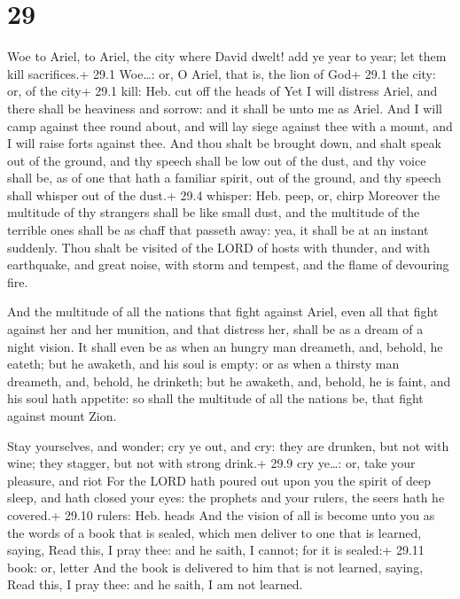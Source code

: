 \hypertarget{section-28}{%
\section{29}\label{section-28}}

 Woe to Ariel, to Ariel, the city where David dwelt! add ye
year to year; let them kill sacrifices.+ 29.1 Woe\ldots: or, O Ariel,
that is, the lion of God+ 29.1 the city: or, of the city+ 29.1 kill:
Heb. cut off the heads of  Yet I will distress Ariel, and
there shall be heaviness and sorrow: and it shall be unto me as Ariel.
 And I will camp against thee round about, and will lay
siege against thee with a mount, and I will raise forts against thee.
 And thou shalt be brought down, and shalt speak out of the
ground, and thy speech shall be low out of the dust, and thy voice shall
be, as of one that hath a familiar spirit, out of the ground, and thy
speech shall whisper out of the dust.+ 29.4 whisper: Heb. peep, or,
chirp  Moreover the multitude of thy strangers shall be like
small dust, and the multitude of the terrible ones shall be as chaff
that passeth away: yea, it shall be at an instant suddenly. 
Thou shalt be visited of the LORD of hosts with thunder, and with
earthquake, and great noise, with storm and tempest, and the flame of
devouring fire.

 And the multitude of all the nations that fight against
Ariel, even all that fight against her and her munition, and that
distress her, shall be as a dream of a night vision.  It
shall even be as when an hungry man dreameth, and, behold, he eateth;
but he awaketh, and his soul is empty: or as when a thirsty man
dreameth, and, behold, he drinketh; but he awaketh, and, behold, he is
faint, and his soul hath appetite: so shall the multitude of all the
nations be, that fight against mount Zion.

 Stay yourselves, and wonder; cry ye out, and cry: they
are drunken, but not with wine; they stagger, but not with strong
drink.+ 29.9 cry ye\ldots: or, take your pleasure, and riot
 For the LORD hath poured out upon you the spirit of deep
sleep, and hath closed your eyes: the prophets and your rulers, the
seers hath he covered.+ 29.10 rulers: Heb. heads  And the
vision of all is become unto you as the words of a book that is sealed,
which men deliver to one that is learned, saying, Read this, I pray
thee: and he saith, I cannot; for it is sealed:+ 29.11 book: or, letter
 And the book is delivered to him that is not learned,
saying, Read this, I pray thee: and he saith, I am not learned.

